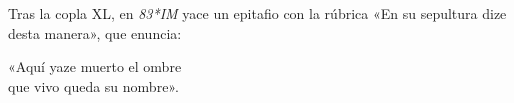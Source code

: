 \documentclass[11pt,a4paper,twoside]{article}
\newcommand{\comillas}[1]{«#1»}
\begin{document}
\vspace{11pt} Tras la copla XL, en \emph{83*IM} yace un epitafio con la rúbrica \comillas{En su sepultura dize desta manera}, que enuncia:\vspace{5pt}

\comillas{Aquí yaze muerto el ombre\\
	que vivo queda su nombre}.
\relax
\vfill
%
\end{document}
